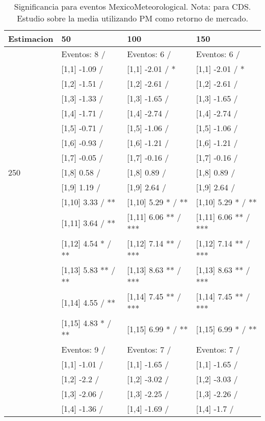 \begin{table}

\caption{Significancia para eventos MexicoMeteorological. Nota: para CDS. Estudio sobre la media utilizando PM como retorno de mercado.}
\centering
\begin{tabular}[t]{llll}
\toprule
Estimacion & 50 & 100 & 150\\
\midrule
 & Eventos:  8 / & Eventos:  6 / & Eventos:  6 /\\
 & {}[1,1] -1.09  / & {}[1,1] -2.01  / * & {}[1,1] -2.01  / *\\
 & {}[1,2] -1.51  / & {}[1,2] -2.61  / & {}[1,2] -2.61  /\\
 & {}[1,3] -1.33  / & {}[1,3] -1.65  / & {}[1,3] -1.65  /\\
 & {}[1,4] -1.71  / & {}[1,4] -2.74  / & {}[1,4] -2.74  /\\
\addlinespace
 & {}[1,5] -0.71  / & {}[1,5] -1.06  / & {}[1,5] -1.06  /\\
 & {}[1,6] -0.93  / & {}[1,6] -1.21  / & {}[1,6] -1.21  /\\
 & {}[1,7] -0.05  / & {}[1,7] -0.16  / & {}[1,7] -0.16  /\\
250 & {}[1,8] 0.58  / & {}[1,8] 0.89  / & {}[1,8] 0.89  /\\
 & {}[1,9] 1.19  / & {}[1,9] 2.64  / & {}[1,9] 2.64  /\\
\addlinespace
 & {}[1,10] 3.33  / ** & {}[1,10] 5.29 * / ** & {}[1,10] 5.29 * / **\\
 & {}[1,11] 3.64  / ** & {}[1,11] 6.06 ** / *** & {}[1,11] 6.06 ** / ***\\
 & {}[1,12] 4.54 * / ** & {}[1,12] 7.14 ** / *** & {}[1,12] 7.14 ** / ***\\
 & {}[1,13] 5.83 ** / ** & {}[1,13] 8.63 ** / *** & {}[1,13] 8.63 ** / ***\\
 & {}[1,14] 4.55  / ** & {}[1,14] 7.45 ** / *** & {}[1,14] 7.45 ** / ***\\
\addlinespace
 & {}[1,15] 4.83 * / ** & {}[1,15] 6.99 * / ** & {}[1,15] 6.99 * / **\\
 & Eventos:  9 / & Eventos:  7 / & Eventos:  7 /\\
 & {}[1,1] -1.01  / & {}[1,1] -1.65  / & {}[1,1] -1.65  /\\
 & {}[1,2] -2.2  / & {}[1,2] -3.02  / & {}[1,2] -3.03  /\\
 & {}[1,3] -2.06  / & {}[1,3] -2.25  / & {}[1,3] -2.26  /\\
\addlinespace
 & {}[1,4] -1.36  / & {}[1,4] -1.69  / & {}[1,4] -1.7  /\\

\end{tabular}
\end{table}
